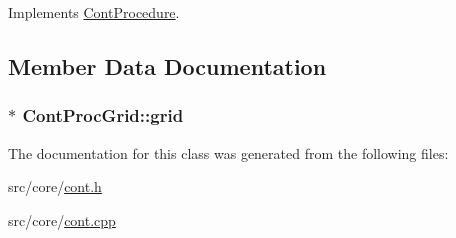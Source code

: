 Implements \hyperlink{a00067_a7f7adefe250a00b3778669ef649f03ac}{Cont\-Procedure}.



\subsection{Member Data Documentation}
\hypertarget{a00073_a4a391d2824571c403d454b29b305aa78}{
\subsubsection[{grid}]{$\ast$ Cont\-Proc\-Grid\-::grid\hspace{0.3cm}{\ttfamily [private]}}}\label{a00073_a4a391d2824571c403d454b29b305aa78}


The documentation for this class was generated from the following files\-:\begin{DoxyCompactItemize}
\item 
src/core/\hyperlink{a00218}{cont.\-h}\item 
src/core/\hyperlink{a00217}{cont.\-cpp}\end{DoxyCompactItemize}
